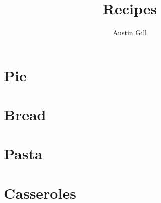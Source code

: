 \documentclass{article}
\title{Recipes}
\author{Austin Gill}
\begin{document}
    \maketitle
    \tableofcontents


    \newpage
    \section{Pie}
        

    \newpage
    \section{Bread}
        

    \newpage
    \section{Pasta}
        

    \newpage
    \section{Casseroles}
        
\end{document}
